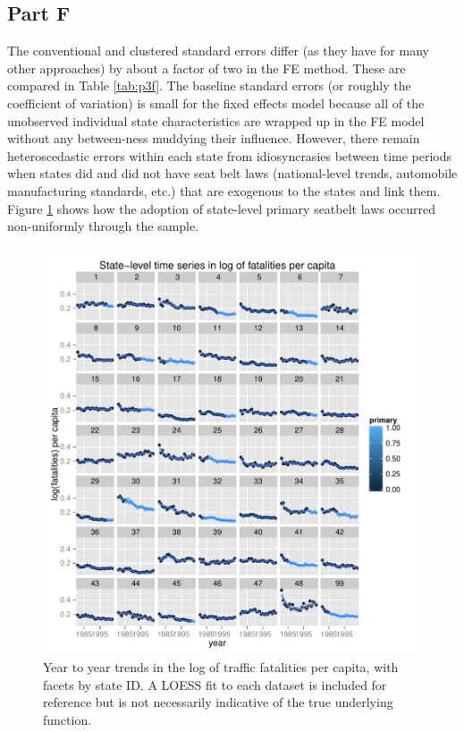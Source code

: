 \documentclass[letterpaper, 12pt]{article}
\begin{document}


\subsection{Part F}

The conventional and clustered standard errors differ (as they have for many other approaches) by about a factor of two in the FE method.  These are compared in Table \ref{tab:p3f}.  The baseline standard errors (or roughly the coefficient of variation) is small for the fixed effects model because all of the unobserved individual state characteristics are wrapped up in the FE model without any between-ness muddying their influence.  However, there remain heteroscedastic errors within each state from idiosyncrasies  between time periods when states did and did not have seat belt laws (national-level trends, automobile manufacturing standards, etc.) that are exogenous to the states and link them.  Figure \ref{fig:3f} shows how the adoption of state-level primary seatbelt laws occurred non-uniformly through the sample.



\begin{figure}[htbp]
\begin{center}
\includegraphics{allstates.pdf}
\caption{Year to year trends in the log of traffic fatalities per capita, with facets by state ID.  A LOESS fit to each dataset is included for reference but is not necessarily indicative of the true underlying function.}
\label{fig:3f}
\end{center}
\end{figure}
\end{document}
